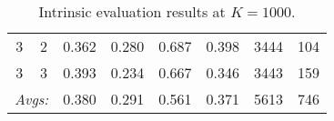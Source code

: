 \begin{enumerate}
{{\begin{table}
{\begin{tabular}{cc|ccccrr}
3 & 2 & 0.362 & 0.280 & 0.687 & 0.398 & 3444 & 104 \\
3 & 3 & 0.393 & 0.234 & 0.667 & 0.346 & 3443 & 159 \\ \hline\hline
\multicolumn{2}{r|}{\textit{Avgs:}} & 0.380 & 0.291 & 0.561 & 0.371 & 5613 & 746 \\
 \end{tabular}
}
 \caption{Intrinsic evaluation results at $K = 1000$.}
 \label{tab:intr-1000}
\end{table}


}}
\end{enumerate}
